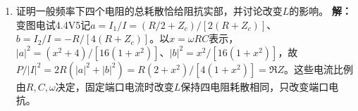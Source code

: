 \documentclass[UTF8,fontset=fandol,a4paper,11pt]{ctexart}
\begin{document}
\begin{enumerate}
\item 证明一般频率下四个电阻的总耗散恰给阻抗实部，并讨论改变$L$的影响。
\textbf{解：}变图电试4.4V5记$a=I_1/I=(R/2+Z_c)/[2(R+Z_c)]$、$b=I_2/I=-R/[4(R+Z_c)]$。以$x=\omega RC$表示，$|a|^2=(x^2+4)/[16(1+x^2)]$、$|b|^2=x^2/[16(1+x^2)]$，故$P/|I|^2=2R(|a|^2+|b|^2)=R(2+x^2)/[4(1+x^2)]=\Re Z$。这些电流比例由$R,C,\omega$决定，固定端口电流时改变$L$保持四电阻耗散相同，只改变端口电抗。
\begin{center}\begin{minipage}{.98\linewidth}\centering
{}
\end{minipage}
\end{center}
\end{enumerate}
\end{document}
